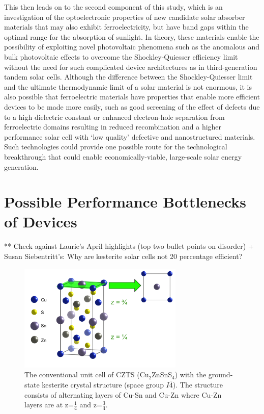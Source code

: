 This then leads on to the second component of this study, which is an investigation of the optoelectronic properties of new candidate solar absorber materials that may also exhibit ferroelectricity, but have band gaps within the optimal range for the absorption of sunlight. 
In theory, these materials 
enable the possibility of exploiting novel photovoltaic phenomena such as the anomalous and bulk photovoltaic effects to overcome the Shockley-Quiesser efficiency limit without the need for such complicated device architectures as in third-generation tandem solar cells. Although the difference between the Shockley-Quiesser limit and the ultimate thermodynamic limit of a solar material is not enormous, it is also possible that ferroelectric materials have properties that enable more efficient devices to be made more easily, such as good screening of the effect of defects due to a high dielectric constant or enhanced electron-hole separation from ferroelectric domains resulting in reduced recombination and a higher performance solar cell with `low quality' defective and nanostructured materials. Such technologies could provide one possible route for the technological breakthrough that could enable economically-viable, large-scale solar energy generation.

\section{Possible Performance Bottlenecks of {\CZTS } Devices}
** Check against Laurie's April highlights (top two bullet points on disorder) + Susan Siebentritt's: Why are kesterite solar cells not 20 percentage efficient?\\

\begin{figure}[h!]
  \centering
    \includegraphics[width=0.7\textwidth]{figures/CZTS_cell.png}
    \caption{The conventional unit cell of CZTS (Cu$_{2}$ZnSnS$_{4}$) with the ground-state kesterite crystal structure (space group $I\bar{4}$). The structure consists of alternating layers of Cu-Sn and Cu-Zn where Cu-Zn layers are at z=$\frac{1}{4}$ and z=$\frac{3}{4}$.}
  \label{CZTS_cell}
\end{figure}


